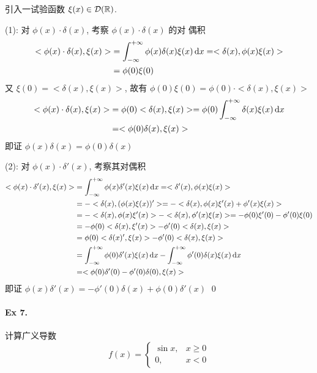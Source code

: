 \begin{solution}
引入一试验函数 $\xi(x) \in \mathcal D({\mathbb R})$.

\noindent (1): 对 $\phi(x) \cdot \delta(x)$, 考察 $\phi(x) \cdot \delta(x)$ 的对
偶积
\begin{align*}
<\phi(x) \cdot \delta(x), \xi(x)>
&= \int_{-\infty}^{+\infty} \phi(x) \delta(x) \xi(x) \operatorname{d\!} x
= <\delta(x), \phi(x) \xi(x)> \\
&= \phi(0) \xi(0)
\end{align*}
又 $\xi(0) = <\delta(x), \xi(x)>$, 故有
$\phi(0)\xi(0) = \phi(0) \cdot <\delta(x), \xi(x)>$
\begin{align*}
<\phi(x) \cdot \delta(x), \xi(x)> &= \phi(0) <\delta(x), \xi(x)>
    = \phi(0) \int_{-\infty}^{+\infty}\delta(x)\xi(x)\operatorname{d\!} x \\
&= <\phi(0) \delta(x), \xi(x)>
\end{align*}
即证 $\phi(x)\delta(x) = \phi(0)\delta(x)$

\noindent (2): 对 $\phi(x) \cdot \delta'(x)$, 考察其对偶积
\begin{align*}
<\phi(x) \cdot \delta'(x), \xi(x)>
&= \int_{-\infty}^{+\infty} \phi(x) \delta'(x) \xi(x) \operatorname{d\!} x
    = <\delta'(x), \phi(x)\xi(x)> \\
&= -<\delta(x), (\phi(x)\xi(x))'>
    = -<\delta(x), \phi(x)\xi'(x) + \phi'(x)\xi(x)> \\
&= -<\delta(x), \phi(x)\xi'(x)> - <\delta(x), \phi'(x)\xi(x)>
    = -\phi(0)\xi'(0) - \phi'(0)\xi(0) \\
&= -\phi(0)<\delta(x), \xi'(x)> - \phi'(0)<\delta(x), \xi(x)> \\
&= \phi(0)<\delta(x)', \xi(x)> - \phi'(0)<\delta(x), \xi(x)> \\
&= \int_{-\infty}^{+\infty} \phi(0)\delta'(x)\xi(x) \operatorname{d\!} x
        - \int_{-\infty}^{+\infty} \phi'(0)\delta(x)\xi(x) \operatorname{d\!} x \\
&= <\phi(0)\delta'(0) - \phi'(0)\delta(0), \xi(x)>
\end{align*}
即证 $\phi(x)\delta'(x) = -\phi'(0)\delta(x) + \phi(0)\delta'(x)$
\qed
\end{solution}
\paragraph{Ex 7.}
计算广义导数
\[ f(x) = \begin{cases} \sin x, & x \geq 0 \\ 0, & x < 0 \end{cases} \]

